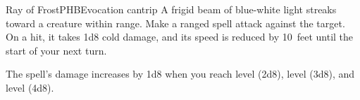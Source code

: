 \begin{spell}{Ray of Frost}{PHB}{Evocation cantrip}
{
}
A frigid beam of blue-white light streaks toward a
creature within range. Make a ranged spell attack
against the target. On a hit, it takes 1d8 cold damage,
and its speed is reduced by 10~feet until the start of
your next turn.

 The spell's damage increases by
1d8 when you reach  level (2d8),
 level (3d8), and  level (4d8).
\end{spell}
